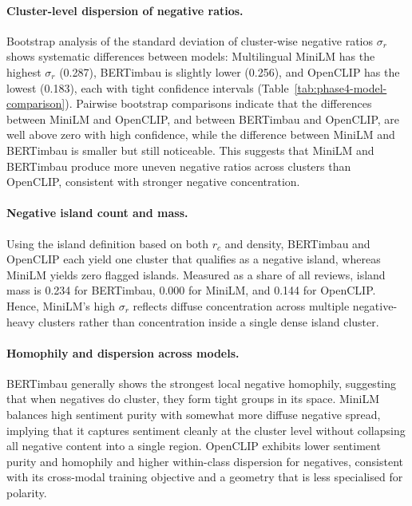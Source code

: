 \documentclass[a4paper,11pt]{article}
\begin{document}
\paragraph{Cluster-level dispersion of negative ratios.}

Bootstrap analysis of the standard deviation of cluster-wise negative ratios $\sigma_r$ shows systematic differences between models: Multilingual MiniLM has the highest $\sigma_r$ (0.287), BERTimbau is slightly lower (0.256), and OpenCLIP has the lowest (0.183), each with tight confidence intervals (Table~\ref{tab:phase4-model-comparison}). 
Pairwise bootstrap comparisons indicate that the differences between MiniLM and OpenCLIP, and between BERTimbau and OpenCLIP, are well above zero with high confidence, while the difference between MiniLM and BERTimbau is smaller but still noticeable. 
This suggests that MiniLM and BERTimbau produce more uneven negative ratios across clusters than OpenCLIP, consistent with stronger negative concentration.

\paragraph{Negative island count and mass.}

Using the island definition based on both $r_c$ and density, BERTimbau and OpenCLIP each yield one cluster that qualifies as a negative island, whereas MiniLM yields zero flagged islands. 
Measured as a share of all reviews, island mass is 0.234 for BERTimbau, 0.000 for MiniLM, and 0.144 for OpenCLIP. 
Hence, MiniLM’s high $\sigma_r$ reflects diffuse concentration across multiple negative-heavy clusters rather than concentration inside a single dense island cluster.

\paragraph{Homophily and dispersion across models.}

BERTimbau generally shows the strongest local negative homophily, suggesting that when negatives do cluster, they form tight groups in its space. 
MiniLM balances high sentiment purity with somewhat more diffuse negative spread, implying that it captures sentiment cleanly at the cluster level without collapsing all negative content into a single region. 
OpenCLIP exhibits lower sentiment purity and homophily and higher within-class dispersion for negatives, consistent with its cross-modal training objective and a geometry that is less specialised for polarity.
\end{document}
